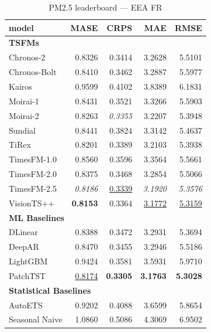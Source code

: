 \begin{table}[H]
\caption{PM2.5 leaderboard --- EEA FR}
\centering
\begin{small}
\begin{tabular}{lrrrr}
\toprule
model & MASE & CRPS & MAE & RMSE \\
\midrule
\multicolumn{5}{l}{\textbf{TSFMs}} \\
Chronos-2 & 0.8326 & 0.3414 & 3.2628 & 5.5101 \\
Chronos-Bolt & 0.8410 & 0.3462 & 3.2887 & 5.5977 \\
Kairos & 0.9599 & 0.4102 & 3.8389 & 6.1831 \\
Moirai-1 & 0.8431 & 0.3521 & 3.3266 & 5.5903 \\
Moirai-2 & 0.8263 & \textit{0.3355} & 3.2207 & 5.3948 \\
Sundial & 0.8441 & 0.3824 & 3.3142 & 5.4637 \\
TiRex & 0.8201 & 0.3389 & 3.2103 & 5.3938 \\
TimesFM-1.0 & 0.8560 & 0.3596 & 3.3564 & 5.5661 \\
TimesFM-2.0 & 0.8375 & 0.3468 & 3.2854 & 5.5066 \\
TimesFM-2.5 & \textit{0.8186} & \underline{0.3339} & \textit{3.1920} & \textit{5.3576} \\
VisionTS++ & \textbf{0.8153} & 0.3364 & \underline{3.1772} & \underline{5.3159} \\
\midrule
\multicolumn{5}{l}{\textbf{ML Baselines}} \\
DLinear & 0.8388 & 0.3472 & 3.2931 & 5.3694 \\
DeepAR & 0.8470 & 0.3455 & 3.2946 & 5.5186 \\
LightGBM & 0.9424 & 0.3581 & 3.5931 & 5.9710 \\
PatchTST & \underline{0.8174} & \textbf{0.3305} & \textbf{3.1763} & \textbf{5.3028} \\
\midrule
\multicolumn{5}{l}{\textbf{Statistical Baselines}} \\
AutoETS & 0.9202 & 0.4088 & 3.6599 & 5.8654 \\
Seasonal Naive & 1.0860 & 0.5086 & 4.3069 & 6.9502 \\
\bottomrule
\end{tabular}
\end{small}
\end{table}